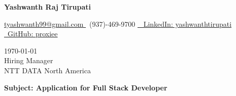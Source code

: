 \documentclass[letterpaper,11pt]{article}
\begin{document}
\begin{center}
    \textbf{\LARGE Yashwanth Raj Tirupati}
    \vspace{4pt}
    
    \small
    \href{mailto:tyashwanth99@gmail.com}{ tyashwanth99@gmail.com }\textbar
     ~(937)-469-9700 \textbar
    \href{https://linkedin.com/in/yashwanthtirupati}{~ LinkedIn: yashwanthtirupati }\textbar 
    \href{https://github.com/proxiee}{~GitHub: proxiee }
\end{center}

\vspace{20pt}

\begin{flushleft}
    \today \\
    \vspace{12pt}
    Hiring Manager \\
    NTT DATA North America \\
\end{flushleft}


\begin{flushleft}
\textbf{Subject: Application for Full Stack Developer}
\end{flushleft}


\end{document}
